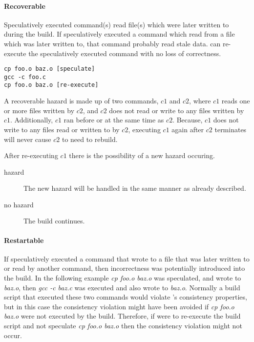 \paragraph{Recoverable}
Speculatively executed command(s) read file(s) which were later written to during the build.  If \Rattle speculatively executed a command which read from a file which was later written to, that command
probably read stale data.  \Rattle can re-execute the speculatively executed command with no loss of correctness.

\begin{verbatim}
cp foo.o baz.o [speculate]
gcc -c foo.c
cp foo.o baz.o [re-execute]
\end{verbatim}

A recoverable hazard is made up of two commands, $c1$ and $c2$, where $c1$ reads one or more files written by $c2$, and $c2$ does not read or write to any files written by $c1$.  Additionally, $c1$ ran before or at the same time as $c2$.  Because, $c1$ does not write to any files read or written to by $c2$, executing $c1$ again after $c2$ terminates will never cause $c2$ to need to rebuild.

After re-executing $c1$ there is the possibility of a new hazard occuring. 
\begin{description}
\item[hazard] The new hazard will be handled in the same manner as already described.
\item[no hazard] The build continues.
\end{description}

\paragraph{Restartable} %
If \Rattle speculatively executed a command that wrote to a file that was later written to or read by another command, then incorrectness was potentially introduced into the build.  In the following example \emph{cp foo.o baz.o} was speculated, and wrote to \emph{baz.o}, then \emph{gcc -c baz.c} was executed and also wrote to \emph{baz.o}.  Normally a build script that executed these two commands would violate \Rattle's consistency properties, but in this case the consistency violation might have been avoided if \emph{cp foo.o baz.o} were not executed by the build.  Therefore, if \Rattle were to re-execute the build script and not speculate \emph{cp foo.o baz.o} then the consistency violation might not occur.

